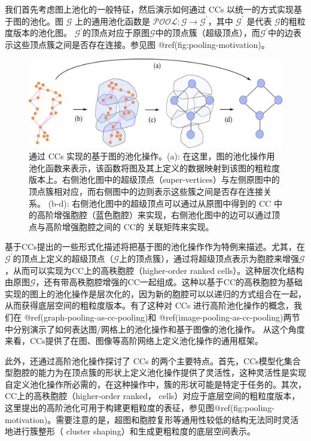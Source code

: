 \documentclass[
  12pt,
]{krantz}
\begin{document}
我们首先考虑图上池化的一般特征，然后演示如何通过 CCs
以统一的方式实现基于图的池化。图 \(\mathcal{G}\) 上的通用池化函数是
\(\mathcal{POOL} \colon \mathcal{G} \to \mathcal{G}^{\prime }\)，其中
\(\mathcal{G}^{\prime}\) 是代表 \(\mathcal{G}\)的粗粒度版本的池化图。
\(\mathcal{G}^{\prime}\)的顶点对应于原图\(\mathcal{G}\)中的顶点簇（超级顶点），而\(\mathcal{G}^{\prime}\)中的边表示这些顶点簇之间是否存在连接。参见图
@ref(fig:pooling-motivation)。

\begin{figure}

{\centering \includegraphics{figures/pooling_motivation} 

}

\caption{通过 CCs 实现的基于图的池化操作。(a): 在这里，图的池化操作用池化函数来表示，该函数将图及其上定义的数据映射到该图的粗粒度版本上。右侧池化图中的超级顶点（super-vertices）与左侧原图中的顶点簇相对应，而右侧图中的边则表示这些簇之间是否存在连接关系。 (b-d): 右侧池化图中的超级顶点可以通过从原图中得到的 CC 中的高阶增强胞腔（蓝色胞腔）来实现，右侧池化图中的边可以通过顶点与高阶增强胞腔之间的 CC的 关联矩阵来实现。}\label{fig:pooling-motivation}
\end{figure}

基于CCs提出的一些形式化描述将把基于图的池化操作作为特例来描述。尤其，在\(\mathcal{G}^{\prime}\)的顶点上定义的超级顶点（\(\mathcal{G}\)上的顶点簇），通过将超级顶点表示为胞腔来增强\(\mathcal{G}\)，从而可以实现为CC上的高秩胞腔（higher-order
ranked
cells）。这种层次化结构由原图\(\mathcal{G}\)，还有带高秩胞腔增强的CC一起组成。这种以基于CC的高秩胞腔为基础实现的图上的池化操作是层次化的，因为新的胞腔可以以递归的方式组合在一起，从而获得底层空间的粗粒度版本。有了这种对
CCs 进行高阶池化操作的概念，我们在 @ref(graph-pooling-as-cc-pooling)和
@ref(image-pooling-as-cc-pooling)两节中分别演示了如何表达图/网格上的池化操作和基于图像的池化操作。
从这个角度来看，CCs提供了在图、图像等高阶网络上定义池化操作的通用框架。

此外，还通过高阶池化操作探讨了 CCs
的两个主要特点。首先，CCs模型化集合型胞腔的能力为在顶点簇的形状上定义池化操作提供了灵活性，这种灵活性是实现自定义池化操作所必需的，在这种操作中，簇的形状可能是特定于任务的。其次，CC上的高秩胞腔（higher-order
ranked，
cells）对应于底层空间的粗粒度版本，这里提出的高阶池化可用于构建更粗粒度的表征，参见图@ref(fig:pooling-motivation)。需要注意的是，超图和胞腔复形等通用性较低的结构无法同时灵活地进行簇整形（
cluster shaping）和生成更粗粒度的底层空间表示。
\end{document}
